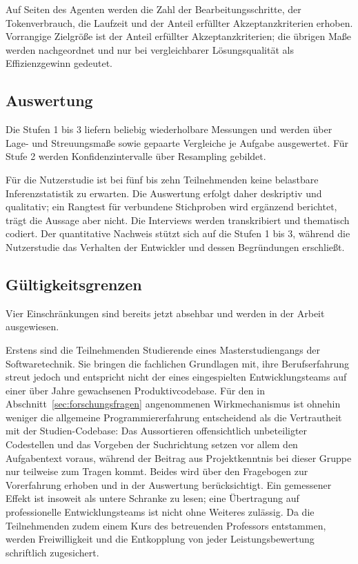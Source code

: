 Auf Seiten des Agenten werden die Zahl der Bearbeitungsschritte, der Tokenverbrauch, die Laufzeit und der Anteil erfüllter Akzeptanzkriterien erhoben. Vorrangige Zielgröße ist der Anteil erfüllter Akzeptanzkriterien; die übrigen Maße werden nachgeordnet und nur bei vergleichbarer Lösungsqualität als Effizienzgewinn gedeutet.

\subsection{Auswertung}

Die Stufen 1 bis 3 liefern beliebig wiederholbare Messungen und werden über Lage- und Streuungsmaße sowie gepaarte Vergleiche je Aufgabe ausgewertet. Für Stufe 2 werden Konfidenzintervalle über Resampling gebildet.

Für die Nutzerstudie ist bei fünf bis zehn Teilnehmenden keine belastbare Inferenzstatistik zu erwarten. Die Auswertung erfolgt daher deskriptiv und qualitativ; ein Rangtest für verbundene Stichproben wird ergänzend berichtet, trägt die Aussage aber nicht. Die Interviews werden transkribiert und thematisch codiert. Der quantitative Nachweis stützt sich auf die Stufen 1 bis 3, während die Nutzerstudie das Verhalten der Entwickler und dessen Begründungen erschließt.

\subsection{Gültigkeitsgrenzen}

Vier Einschränkungen sind bereits jetzt absehbar und werden in der Arbeit ausgewiesen.

Erstens sind die Teilnehmenden Studierende eines Masterstudiengangs der Softwaretechnik. Sie bringen die fachlichen Grundlagen mit, ihre Berufserfahrung streut jedoch und entspricht nicht der eines eingespielten Entwicklungsteams auf einer über Jahre gewachsenen Produktivcodebase. Für den in Abschnitt~\ref{sec:forschungsfragen} angenommenen Wirkmechanismus ist ohnehin weniger die allgemeine Programmiererfahrung entscheidend als die Vertrautheit mit der Studien-Codebase: Das Aussortieren offensichtlich unbeteiligter Codestellen und das Vorgeben der Suchrichtung setzen vor allem den Aufgabentext voraus, während der Beitrag aus Projektkenntnis bei dieser Gruppe nur teilweise zum Tragen kommt. Beides wird über den Fragebogen zur Vorerfahrung erhoben und in der Auswertung berücksichtigt. Ein gemessener Effekt ist insoweit als untere Schranke zu lesen; eine Übertragung auf professionelle Entwicklungsteams ist nicht ohne Weiteres zulässig. Da die Teilnehmenden zudem einem Kurs des betreuenden Professors entstammen, werden Freiwilligkeit und die Entkopplung von jeder Leistungsbewertung schriftlich zugesichert.

